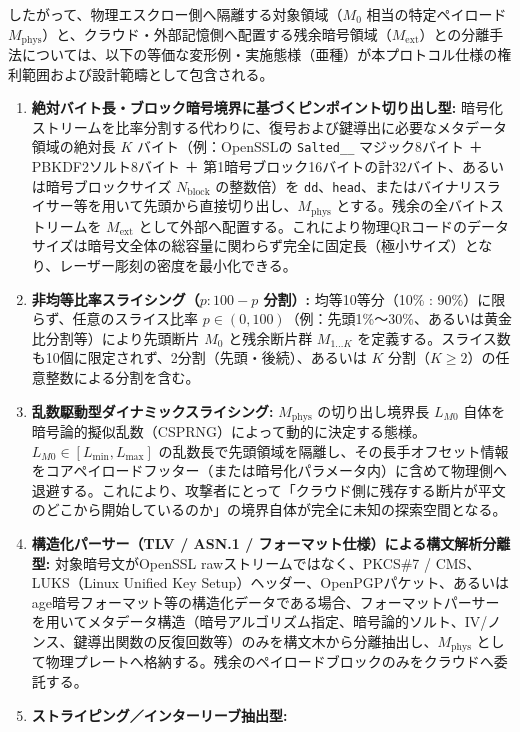 \documentclass[11pt,a4paper,titlepage]{article}
\begin{document}
したがって、物理エスクロー側へ隔離する対象領域（$M_0$ 相当の特定ペイロード $M_{\text{phys}}$）と、クラウド・外部記憶側へ配置する残余暗号領域（$M_{\text{ext}}$）との分離手法については、以下の等価な変形例・実施態様（亜種）が本プロトコル仕様の権利範囲および設計範疇として包含される。

\begin{enumerate}
  \item \textbf{絶対バイト長・ブロック暗号境界に基づくピンポイント切り出し型:}
    暗号化ストリームを比率分割する代わりに、復号および鍵導出に必要なメタデータ領域の絶対長 $K$ バイト（例：OpenSSLの \texttt{Salted\_\_} マジック8バイト ＋ PBKDF2ソルト8バイト ＋ 第1暗号ブロック16バイトの計32バイト、あるいは暗号ブロックサイズ $N_{\text{block}}$ の整数倍）を \texttt{dd}、\texttt{head}、またはバイナリスライサー等を用いて先頭から直接切り出し、$M_{\text{phys}}$ とする。残余の全バイトストリームを $M_{\text{ext}}$ として外部へ配置する。これにより物理QRコードのデータサイズは暗号文全体の総容量に関わらず完全に固定長（極小サイズ）となり、レーザー彫刻の密度を最小化できる。
  \item \textbf{非均等比率スライシング（$p : 100-p$ 分割）:}
    均等10等分（10\% : 90\%）に限らず、任意のスライス比率 $p \in (0, 100)$（例：先頭1\%〜30\%、あるいは黄金比分割等）により先頭断片 $M_0$ と残余断片群 $M_{1\dots K}$ を定義する。スライス数も10個に限定されず、2分割（先頭・後続）、あるいは $K$ 分割（$K \ge 2$）の任意整数による分割を含む。
  \item \textbf{乱数駆動型ダイナミックスライシング:}
    $M_{\text{phys}}$ の切り出し境界長 $L_{M0}$ 自体を暗号論的擬似乱数（CSPRNG）によって動的に決定する態様。$L_{M0} \in [L_{\min}, L_{\max}]$ の乱数長で先頭領域を隔離し、その長手オフセット情報をコアペイロードフッター（または暗号化パラメータ内）に含めて物理側へ退避する。これにより、攻撃者にとって「クラウド側に残存する断片が平文のどこから開始しているのか」の境界自体が完全に未知の探索空間となる。
  \item \textbf{構造化パーサー（TLV / ASN.1 / フォーマット仕様）による構文解析分離型:}
    対象暗号文がOpenSSL rawストリームではなく、PKCS\#7 / CMS、LUKS（Linux Unified Key Setup）ヘッダー、OpenPGPパケット、あるいはage暗号フォーマット等の構造化データである場合、フォーマットパーサーを用いてメタデータ構造（暗号アルゴリズム指定、暗号論的ソルト、IV/ノンス、鍵導出関数の反復回数等）のみを構文木から分離抽出し、$M_{\text{phys}}$ として物理プレートへ格納する。残余のペイロードブロックのみをクラウドへ委託する。
  \item \textbf{ストライピング／インターリーブ抽出型:}

\end{enumerate}
\end{document}
